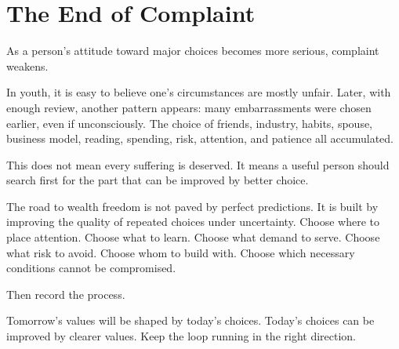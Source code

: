 \section*{The End of Complaint}

As a person's attitude toward major choices becomes more serious, complaint weakens.

In youth, it is easy to believe one's circumstances are mostly unfair. Later, with enough review, another pattern appears: many embarrassments were chosen earlier, even if unconsciously. The choice of friends, industry, habits, spouse, business model, reading, spending, risk, attention, and patience all accumulated.

This does not mean every suffering is deserved. It means a useful person should search first for the part that can be improved by better choice.

The road to wealth freedom is not paved by perfect predictions. It is built by improving the quality of repeated choices under uncertainty. Choose where to place attention. Choose what to learn. Choose what demand to serve. Choose what risk to avoid. Choose whom to build with. Choose which necessary conditions cannot be compromised.

Then record the process.

Tomorrow's values will be shaped by today's choices. Today's choices can be improved by clearer values. Keep the loop running in the right direction.
